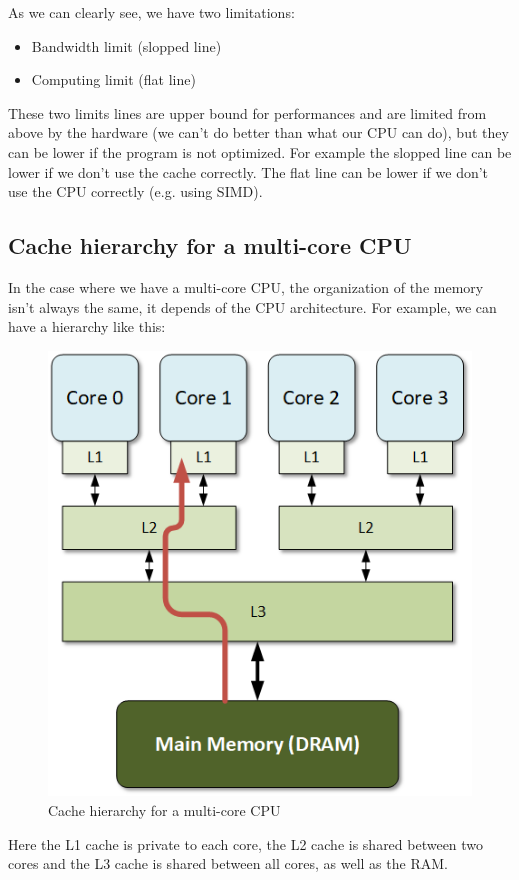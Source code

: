 \documentclass[12pt, openany]{report}
\theoremstyle{definition}
\begin{document}
As we can clearly see, we have two limitations:
\begin{itemize}
	\item Bandwidth limit (slopped line)
	\item Computing limit (flat line)
\end{itemize}
These two limits lines are upper bound for performances and are limited from above by the hardware (we can't do better than what our CPU can do), but they can be lower if the program is not optimized. For example the slopped line can be lower if we don't use the cache correctly. The flat line can be lower if we don't use the CPU correctly (e.g. using SIMD).\\
\newpage
\subsection{Cache hierarchy for a multi-core CPU}
In the case where we have a multi-core CPU, the organization of the memory isn't always the same, it depends of the CPU architecture. For example, we can have a hierarchy like this:
\begin{figure}[H]
	\centering
	\includegraphics[scale=0.5]{img/multicore-cache.png}
	\caption{Cache hierarchy for a multi-core CPU}
	\label{fig:multi_core_cache}
\end{figure}
Here the L1 cache is private to each core, the L2 cache is shared between two cores and the L3 cache is shared between all cores, as well as the RAM. 
\end{document}
